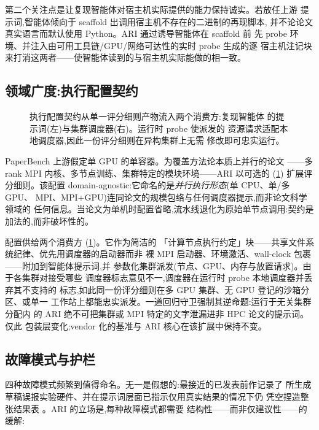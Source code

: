 第二个关注点是让复现智能体对宿主机实际提供的能力保持诚实。若放任上游
提示词,智能体倾向于 scaffold 出调用宿主机不存在的二进制的再现脚本,
并不论论文真实语言而默认使用 Python。ARI 通过诱导智能体在 scaffold 前
先 probe 环境、并注入由可用工具链/GPU/网络可达性的实时 probe 生成的逐
宿主机注记块来打消这两者——使智能体读到的与宿主机实际能做的相一致。

\subsection{领域广度:执行配置契约}\label{sec:paper:paperbench:v072}

\begin{figure}[t]
  \centering
  \resizebox{\columnwidth}{!}{}
  \caption{执行配置契约从单一评分细则产物流入两个消费方:复现智能体
           的提示词(左)与集群调度器(右)。运行时 probe 使派发的
           资源请求适配本地调度器,因此一份评分细则在异构集群上无需
           修改即可忠实运行。}
  \label{fig:execution-profile}
\end{figure}

PaperBench 上游假定单 GPU 的单容器。为覆盖方法论本质上并行的论文
——多 rank MPI 内核、多节点训练、集群特定的模块环境——ARI 以可选的
 (\cref{fig:execution-profile}) 扩展评分细则。该配置
domain-agnostic:它命名的是\emph{并行执行形态}(单 CPU、单/多 GPU、
MPI、MPI+GPU)连同论文的规模包络与任何调度器提示,而非论文科学领域的
任何信息。当论文为单机时配置省略,流水线退化为原始单节点调用:契约是
加法的,而非破坏性的。

配置供给两个消费方 (\cref{fig:execution-profile})。它作为简洁的
「计算节点执行约定」块——共享文件系统纪律、优先用调度器的启动器而非
裸 MPI 启动器、环境激活、wall-clock 包裹——附加到智能体提示词,并
参数化集群派发(节点、GPU、内存与放置请求)。由于各集群对接受哪些
调度器标志意见不一,调度器在运行时 probe 本地调度器并丢弃其不支持的
标志,如此同一份评分细则在多 GPU 集群、无 GPU 登记的沙箱分区、或单一
工作站上都能忠实派发。一道回归守卫强制其逆命题:运行于无关集群分配内
的 ARI 绝不可把集群或 MPI 特定的文字泄漏进非 HPC 论文的提示词。仅此
包装层变化;vendor 化的基准与 ARI 核心在该扩展中保持不变。

\subsection{故障模式与护栏}\label{sec:paper:failures}

四种故障模式频繁到值得命名。无一是假想的:最接近的已发表前作记录了
所生成草稿误报实验硬件、并在提示词层面已指示仅用真实结果的情况下仍
凭空捏造整张结果表 \cite{lu2024ai}。ARI 的立场是,每种故障模式都需要
结构性——而非仅建议性——的缓解:

